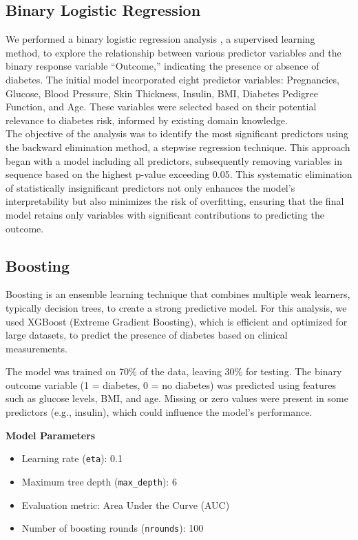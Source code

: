 \documentclass[12pt]{article}
\begin{document}
\subsection{Binary Logistic Regression}
We performed a binary logistic regression analysis \cite{faraway2016extending}, a supervised learning method, to explore the relationship between various predictor variables and the binary response variable “Outcome,” indicating the presence or absence of diabetes. The initial model incorporated eight predictor variables: Pregnancies, Glucose, Blood Pressure, Skin Thickness, Insulin, BMI, Diabetes Pedigree Function, and Age. These variables were selected based on their potential relevance to diabetes risk, informed by existing domain knowledge.\\
\setlength{\parindent}{0pt}
The objective of the analysis was to identify the most significant predictors using the backward elimination method, a stepwise regression technique. This approach began with a model including all predictors, subsequently removing variables in sequence based on the highest p-value exceeding 0.05. This systematic elimination of statistically insignificant predictors not only enhances the model’s interpretability but also minimizes the risk of overfitting, ensuring that the final model retains only variables with significant contributions to predicting the outcome.

\subsection{Boosting}

Boosting \cite{chen2015xgboost} \cite{friedman2001greedy} is an ensemble learning technique that combines multiple weak learners, typically decision trees, to create a strong predictive model. For this analysis, we used XGBoost (Extreme Gradient Boosting), which is efficient and optimized for large datasets, to predict the presence of diabetes based on clinical measurements.

The model was trained on 70\% of the data, leaving 30\% for testing. The binary outcome variable (1 = diabetes, 0 = no diabetes) was predicted using features such as glucose levels, BMI, and age. Missing or zero values were present in some predictors (e.g., insulin), which could influence the model's performance.

\textbf{Model Parameters}
\begin{itemize}
	\item Learning rate (\texttt{eta}): 0.1
	\item Maximum tree depth (\texttt{max\_depth}): 6
	\item Evaluation metric: Area Under the Curve (AUC)
	\item Number of boosting rounds (\texttt{nrounds}): 100
\end{itemize}
\end{document}
